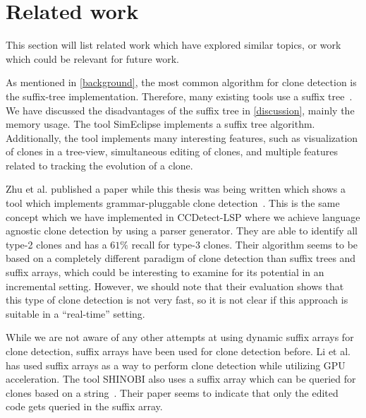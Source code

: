 \section{Related work}

This section will list related work which have explored similar topics, or work which
could be relevant for future work.

As mentioned in \cref{background}, the most common algorithm for clone detection is the
suffix-tree implementation. Therefore, many existing tools use a suffix
tree~\cite{GodeIncrementalCloneDetection, Zibran_real_time_search}. We have discussed the
disadvantages of the suffix tree in \cref{discussion}, mainly the memory usage. The tool
SimEclipse implements a suffix tree algorithm. Additionally, the tool implements many
interesting features, such as visualization of clones in a tree-view, simultaneous editing
of clones, and multiple features related to tracking the evolution of a clone.

Zhu et al. published a paper while this thesis was being written which shows a tool which
implements grammar-pluggable clone detection~\cite{GrammarPluggableCloneDetection}. This
is the same concept which we have implemented in CCDetect-LSP where we achieve language
agnostic clone detection by using a parser generator. They are able to identify all type-2
clones and has a $61\%$ recall for type-3 clones. Their algorithm seems to be based on a
completely different paradigm of clone detection than suffix trees and suffix arrays,
which could be interesting to examine for its potential in an incremental setting.
However, we should note that their evaluation shows that this type of clone detection is
not very fast, so it is not clear if this approach is suitable in a ``real-time'' setting.

While we are not aware of any other attempts at using dynamic suffix arrays for clone
detection, suffix arrays have been used for clone detection before. Li et al.~\cite{SAGA}
has used suffix arrays as a way to perform clone detection while utilizing GPU
acceleration. The tool SHINOBI also uses a suffix array which can be queried for clones
based on a string~\cite{SHINOBI}. Their paper seems to indicate that only the edited code
gets queried in the suffix array.


